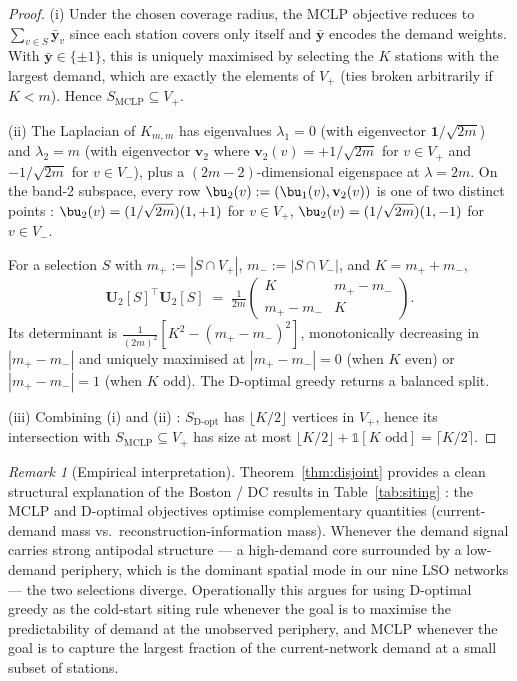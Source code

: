 \documentclass[11pt,a4paper]{article}
\newcommand{\1}{\mathbb{1}}
\newcommand{\bU}{\mathbf{U}}
\newcommand{\bone}{\mathbf{1}}
\newcommand{\bv}{\mathbf{v}}
\newcommand{\by}{\bar{\mathbf{y}}}
\theoremstyle{plain}
\theoremstyle{definition}
\theoremstyle{remark}
\newtheorem{remark}[theorem]{Remark}
\begin{document}
\begin{proof}
(i) Under the chosen coverage radius, the MCLP objective reduces
to $\sum_{v \in S} \by_v$ since each station covers only itself
and $\by$ encodes the demand weights.  With $\by \in \{\pm 1\}$,
this is uniquely maximised by selecting the $K$ stations with
the largest demand, which are exactly the elements of $V_+$
(ties broken arbitrarily if $K < m$).  Hence $S_{\mathrm{MCLP}}
\subseteq V_+$.

(ii) The Laplacian of $K_{m,m}$ has eigenvalues $\lambda_1 = 0$
(with eigenvector $\bone/\sqrt{2m}$) and $\lambda_2 = m$ (with
eigenvector $\bv_2$ where $\bv_2(v) = +1/\sqrt{2m}$ for
$v \in V_+$ and $-1/\sqrt{2m}$ for $v \in V_-$), plus a
$(2m-2)$-dimensional eigenspace at $\lambda = 2m$.  On the band-2
subspace, every row $\bu_2(v) := (\bu_1(v), \bv_2(v))$ is one of
two distinct points :
$\bu_2(v) = (1/\sqrt{2m})(1, +1)$ for $v \in V_+$,
$\bu_2(v) = (1/\sqrt{2m})(1, -1)$ for $v \in V_-$.

For a selection $S$ with $m_+ := |S \cap V_+|$,
$m_- := |S \cap V_-|$, and $K = m_+ + m_-$,
\[
    \bU_2[S]^\top \bU_2[S]
    \;=\; \tfrac{1}{2m}
        \begin{pmatrix} K & m_+ - m_- \\ m_+ - m_- & K \end{pmatrix}.
\]
Its determinant is
$\frac{1}{(2m)^2}\!\left[K^2 - (m_+ - m_-)^2\right]$, monotonically
decreasing in $|m_+ - m_-|$ and uniquely maximised at
$|m_+ - m_-| = 0$ (when $K$ even) or
$|m_+ - m_-| = 1$ (when $K$ odd).  The D-optimal greedy returns
a balanced split.

(iii) Combining (i) and (ii) : $S_{\mathrm{D\text{-}opt}}$ has
$\lfloor K/2 \rfloor$ vertices in $V_+$, hence its intersection
with $S_{\mathrm{MCLP}} \subseteq V_+$ has size at most
$\lfloor K/2 \rfloor + \mathbb{1}[K \text{ odd}] = \lceil K/2 \rceil$.
\end{proof}

\begin{remark}[Empirical interpretation]
Theorem~\ref{thm:disjoint} provides a clean structural
explanation of the Boston / DC results in
Table~\ref{tab:siting} : the MCLP and D-optimal objectives
optimise complementary quantities (current-demand mass vs.\
reconstruction-information mass).  Whenever the demand signal
carries strong antipodal structure --- a high-demand core
surrounded by a low-demand periphery, which is the dominant
spatial mode in our nine LSO networks --- the two selections
diverge.  Operationally this argues for using D-optimal greedy
as the cold-start siting rule whenever the goal is to maximise
the predictability of demand at the unobserved periphery, and
MCLP whenever the goal is to capture the largest fraction of
the current-network demand at a small subset of stations.
\end{remark}
\end{document}
